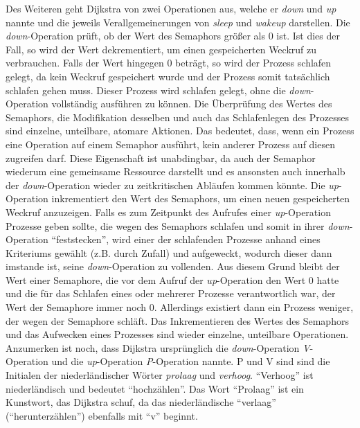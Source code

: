 \begin{description}
\begin{description}
								Des Weiteren geht Dijkstra von zwei Operationen aus, welche er \textit{down} und \textit{up} nannte und die jeweils Verallgemeinerungen von \textit{sleep} und \textit{wakeup} darstellen. Die \textit{down}-Operation prüft, ob der Wert des Semaphors größer als 0 ist. Ist dies der Fall, so wird der Wert dekrementiert, um einen gespeicherten Weckruf zu verbrauchen. Falls der Wert hingegen 0 beträgt, so wird der Prozess schlafen gelegt, da kein Weckruf gespeichert wurde und der Prozess somit tatsächlich schlafen gehen muss. Dieser Prozess wird schlafen gelegt, ohne die \textit{down}-Operation vollständig ausführen zu können. Die Überprüfung des Wertes des Semaphors, die Modifikation desselben und auch das Schlafenlegen des Prozesses sind einzelne, unteilbare, atomare Aktionen. Das bedeutet, dass, wenn ein Prozess eine Operation auf einem Semaphor ausführt, kein anderer Prozess auf diesen zugreifen darf. Diese Eigenschaft ist unabdingbar, da auch der Semaphor wiederum eine gemeinsame Ressource darstellt und es ansonsten auch innerhalb der \textit{down}-Operation wieder zu zeitkritischen Abläufen kommen könnte. Die \textit{up}-Operation inkrementiert den Wert des Semaphors, um einen neuen gespeicherten Weckruf anzuzeigen. Falls es zum Zeitpunkt des Aufrufes einer \textit{up}-Operation Prozesse geben sollte, die wegen des Semaphors schlafen und somit in ihrer \textit{down}-Operation "`feststecken"', wird einer der schlafenden Prozesse anhand eines Kriteriums gewählt (z.B. durch Zufall) und aufgeweckt, wodurch dieser dann imstande ist, seine \textit{down}-Operation zu vollenden. Aus diesem Grund bleibt der Wert einer Semaphore, die vor dem Aufruf der \textit{up}-Operation den Wert 0 hatte und die für das Schlafen eines oder mehrerer Prozesse verantwortlich war, der Wert der Semaphore immer noch 0. Allerdings existiert dann ein Prozess weniger, der wegen der Semaphore schläft. Das Inkrementieren des Wertes des Semaphors und das Aufwecken eines Prozesses sind wieder einzelne, unteilbare Operationen. Anzumerken ist noch, dass Dijkstra ursprünglich die \textit{down}-Operation \textit{V}-Operation und die \textit{up}-Operation \textit{P}-Operation nannte. P und V sind sind die Initialen der niederländischer Wörter \textit{prolaag} und \textit{verhoog}. "`Verhoog"' ist niederländisch und bedeutet "`hochzählen"'. Das Wort "`Prolaag"' ist ein Kunstwort, das Dijkstra schuf, da das niederländische "`verlaag"' ("`herunterzählen"') ebenfalls mit "`v"' beginnt. \cite{SemaphorBorchert}  \cite{ModerneBetriebssysteme}\\


\end{description}
\end{description}
